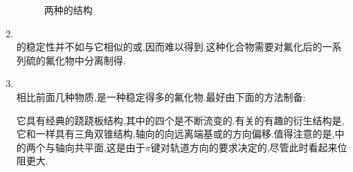 \documentclass{ctexart}
\begin{document}
\begin{enumerate}[label=\tbf{\arabic*},topsep=0pt,parsep=0pt,itemsep=0pt,partopsep=0pt]
\begin{figure}[H]
{            }
            \caption{两种的结构}
        \end{figure}
    \item {}\\
        \indent {}的稳定性并不如与它相似的或,因而难以得到.这种化合物需要对氟化后的一系列硫的氟化物中分离制得.
    \item {}\\
        \indent 相比前面几种物质,是一种稳定得多的氟化物.最好由下面的方法制备:
        \begin{center}
        \end{center}
        它具有经典的跷跷板结构,其中的四个是不断流变的.有关的有趣的衍生结构是,它和一样具有三角双锥结构,轴向的向远离端基或的方向偏移.值得注意的是,中的两个与轴向共平面,这是由于$\pi$键对轨道方向的要求决定的,尽管此时看起来位阻更大.
        \begin{figure}[H]
            \centering
            \subfigure[\ce{(H2C)SF4}的结构]{
}
\end{figure}
\end{enumerate}
\end{document}
